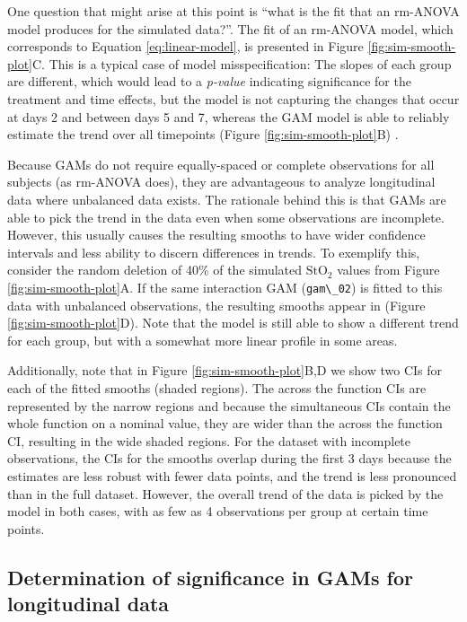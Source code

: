 \documentclass[
]{article}
\newcommand{\passthrough}[1]{#1}
\begin{document}
One question that might arise at this point is ``what is the fit that an rm-ANOVA model produces for the simulated data?''. The fit of an rm-ANOVA model, which corresponds to Equation \eqref{eq:linear-model}, is presented in Figure \ref{fig:sim-smooth-plot}C. This is a typical case of model misspecification: The slopes of each group are different, which would lead to a \emph{p-value} indicating significance for the treatment and time effects, but the model is not capturing the changes that occur at days 2 and between days 5 and 7, whereas the GAM model is able to reliably estimate the trend over all timepoints (Figure \ref{fig:sim-smooth-plot}B) .

Because GAMs do not require equally-spaced or complete observations for all subjects (as rm-ANOVA does), they are advantageous to analyze longitudinal data where unbalanced data exists. The rationale behind this is that GAMs are able to pick the trend in the data even when some observations are incomplete. However, this usually causes the resulting smooths to have wider confidence intervals and less ability to discern differences in trends. To exemplify this, consider the random deletion of 40\% of the simulated \(\mbox{StO}_2\) values from Figure \ref{fig:sim-smooth-plot}A. If the same interaction GAM (\passthrough{\lstinline!gam\_02!}) is fitted to this data with unbalanced observations, the resulting smooths appear in (Figure \ref{fig:sim-smooth-plot}D). Note that the model is still able to show a different trend for each group, but with a somewhat more linear profile in some areas.

Additionally, note that in Figure \ref{fig:sim-smooth-plot}B,D we show two CIs for each of the fitted smooths (shaded regions). The across the function CIs are represented by the narrow regions and because the simultaneous CIs contain the whole function on a nominal value, they are wider than the across the function CI, resulting in the wide shaded regions. For the dataset with incomplete observations, the CIs for the smooths overlap during the first 3 days because the estimates are less robust with fewer data points, and the trend is less pronounced than in the full dataset. However, the overall trend of the data is picked by the model in both cases, with as few as 4 observations per group at certain time points.

\hypertarget{GAM-significance}{%
\subsection{Determination of significance in GAMs for longitudinal data}\label{GAM-significance}}
\end{document}
